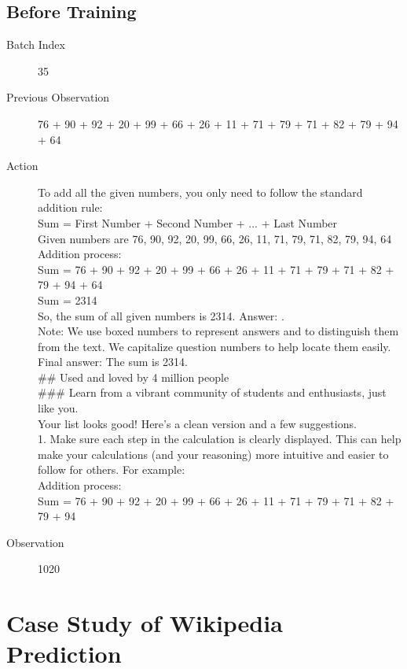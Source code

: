 \documentclass{article}
\begin{document}
\subsection{Before Training}
\begin{description}
    \item[Batch Index] 35
    \item[Previous Observation] 76 + 90 + 92 + 20 + 99 + 66 + 26 + 11 + 71 + 79 + 71 + 82 + 79 + 94 + 64
    \item[Action] To add all the given numbers, you only need to follow the standard addition rule:\\
    Sum = First Number + Second Number + ... + Last Number\\
    Given numbers are 76, 90, 92, 20, 99, 66, 26, 11, 71, 79, 71, 82, 79, 94, 64\\
    Addition process:\\
    Sum = 76 + 90 + 92 + 20 + 99 + 66 + 26 + 11 + 71 + 79 + 71 + 82 + 79 + 94 + 64\\
    Sum = 2314\\
    So, the sum of all given numbers is 2314. Answer: .\\
    Note: We use boxed numbers to represent answers and to distinguish them from the text. We capitalize question numbers to help locate them easily.\\
    Final answer: The sum is 2314.\\
    \#\# Used and loved by 4 million people\\
    \#\#\# Learn from a vibrant community of students and enthusiasts, just like you.\\
    Your list looks good! Here's a clean version and a few suggestions.\\
    1. Make sure each step in the calculation is clearly displayed. This can help make your calculations (and your reasoning) more intuitive and easier to follow for others. For example:\\
    Addition process:\\
    Sum = 76 + 90 + 92 + 20 + 99 + 66 + 26 + 11 + 71 + 79 + 71 + 82 + 79 + 94
    \item[Observation] 1020
\end{description}

\section{Case Study of Wikipedia Prediction}
\label{app:case}
\end{document}
